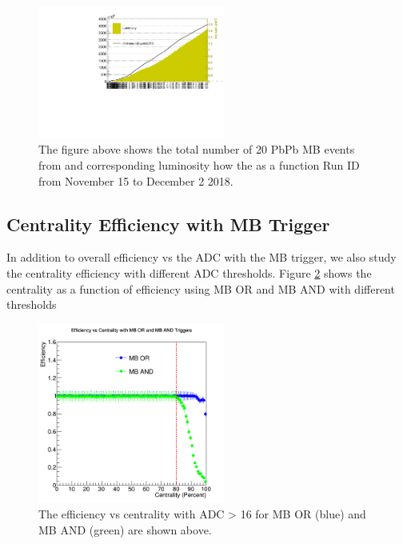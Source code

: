 \begin{figure}[hbtp]
\begin{center}
\includegraphics[width=0.55\textwidth]{Figures/Chapter3/MBStat.pdf}
\caption{The figure above shows the total number of 20 PbPb MB events from and corresponding luminosity how the as a function Run ID from November 15 to December 2 2018.}
\label{MBStat}
\end{center}
\end{figure} 


\subsection{Centrality Efficiency with MB Trigger}

In addition to overall efficiency vs the ADC with the MB trigger, we also study the centrality efficiency with different ADC thresholds. Figure \ref{EffCent} shows the centrality as a function of efficiency using MB OR and MB AND with different thresholds

\begin{figure}[hbtp]
\begin{center}
\includegraphics[width=0.55\textwidth]{Figures/Chapter3/EffCent.png}
\caption{The efficiency vs centrality with ADC > 16 for MB OR (blue) and MB AND (green) are shown above.}
\label{EffCent}
\end{center}
\end{figure} 


